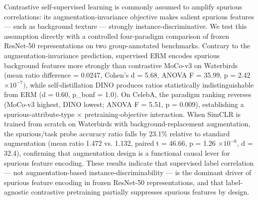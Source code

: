 
Contrastive self-supervised learning is commonly assumed to amplify spurious correlations: its augmentation-invariance objective makes salient spurious features --- such as background texture --- strongly instance-discriminative. We test this assumption directly with a controlled four-paradigm comparison of frozen ResNet-50 representations on two group-annotated benchmarks. Contrary to the augmentation-invariance prediction, supervised ERM encodes spurious background features more strongly than contrastive MoCo-v3 on Waterbirds (mean ratio difference = 0.0247, Cohen's d = 5.68, ANOVA F = 35.99, p = 2.42 $\times 10^{-7})$, while self-distillation DINO produces ratios statistically indistinguishable from ERM (d = 0.60, p\_bonf = 1.0). On CelebA, the paradigm ranking reverses (MoCo-v3 highest, DINO lowest; ANOVA F = 5.51, p = 0.009), establishing a spurious-attribute-type $\times$ pretraining-objective interaction. When SimCLR is trained from scratch on Waterbirds with background-replacement augmentation, the spurious/task probe accuracy ratio falls by 23.1\% relative to standard augmentation (mean ratio 1.472 vs. 1.132, paired t = 46.66, p = 1.26 $\times 10^{-6}$, d = 32.4), confirming that augmentation design is a functional causal lever for spurious feature encoding. These results indicate that supervised label correlation --- not augmentation-based instance-discriminability --- is the dominant driver of spurious feature encoding in frozen ResNet-50 representations, and that label-agnostic contrastive pretraining partially suppresses spurious features by design.

